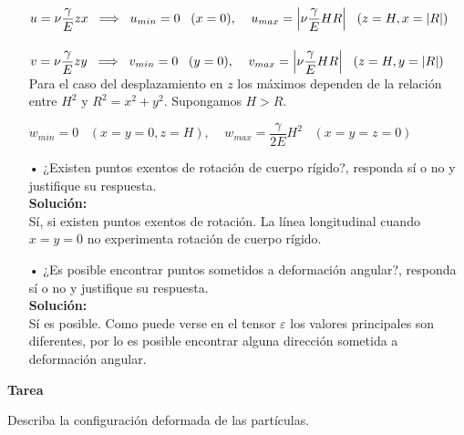 \documentclass[../notas medios.tex]{subfiles}
\begin{document}
\begin{enumerate}
$u =  \nu \dfrac{\gamma}{E} zx  \;\; \Longrightarrow  \;\; u_{min} = 0  \;\;\; (x=0),  \;\;\;\;  u_{max} =\abs{ \nu \dfrac{\gamma}{E} HR} \;\;\; (z=H, x=\abs{R})$ \\\\
$v =  \nu \dfrac{\gamma}{E} zy  \;\; \Longrightarrow  \;\; v_{min} = 0  \;\;\; (y=0),  \;\;\;\;  v_{max} =\abs{ \nu \dfrac{\gamma}{E} HR} \;\;\; (z=H, y=\abs{R})$ \\

	Para el caso del desplazamiento en $z$ los máximos dependen de la relación entre $H^2$ y $R^2=x^2 + y^2$. Supongamos $H>R$. 
	

$w_{min} = 0  \;\;\; ( x=y=0,z=H),  \;\;\;\;  w_{max} = \dfrac{\gamma}{2E} H^2  \;\;\; ( x=y=z=0)$ \\


	\item[•]¿Existen puntos exentos de rotaci\'on de cuerpo r\'igido?, responda s\'i o no y justifique su respuesta.\\
	
	\textbf{Solución:}\\
	
	Sí, si existen puntos exentos de rotación. La línea longitudinal cuando $x=y=0$ no experimenta rotación de cuerpo rígido. 
	 
	\item[•]¿Es posible encontrar puntos sometidos a deformación angular?, responda s\'i o no y justifique su respuesta. \\
	
		\textbf{Solución:}\\
		
		Sí es posible. Como puede verse en el tensor  $\varepsilon$ los valores principales son diferentes, por lo es posible encontrar alguna dirección sometida a deformación angular.
%
\end{enumerate}

\textbf{Tarea}

Describa la configuración deformada de las partículas. 
\end{document}
